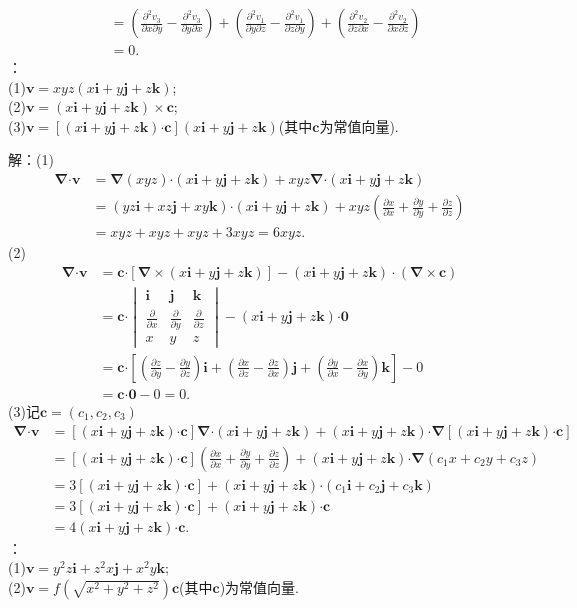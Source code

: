 \documentclass[12pt,UTF8,fleqn]{ctexart}
\newcommand{\pp}[2]{\frac{\partial #1}{\partial #2}}
\begin{document}
\begin{enumerate}
\[\begin{split}
&=(\frac{\partial^2 v_3}{\partial x\partial y}-\frac{\partial^2 v_3}{\partial y\partial x})+(\frac{\partial^2 v_1}{\partial y\partial  z}-\frac{\partial^2 v_1}{\partial z\partial y})+(\frac{\partial^2 v_2}{\partial z\partial x}-\frac{\partial^2 v_2}{\partial x\partial z})\\
&=0.
\end{split}\]
：\\
(1)$\bm v=xyz(x\bm i+y\bm j+z\bm k)$;\\
(2)$\bm v=(x\bm i+y\bm j+z\bm k)\times\bm c$;\\
(3)$\bm v=[(x\bm i+y\bm j+z\bm k)\bm\cdot\bm c](x\bm i+y\bm j+z\bm k)$(其中$\bm c$为常值向量).

解：(1)\[\begin{split}
\bm\nabla\bm\cdot\bm v&=\bm\nabla(xyz)\bm\cdot(x\bm i+y\bm j+z\bm k)+xyz\bm\nabla\bm\cdot(x\bm i+y\bm j+z\bm k)\\
&=(yz\bm i+xz\bm j+xy\bm k)\bm\cdot(x\bm i+y\bm j+z\bm k)+xyz(\pp xx+\pp yy+\pp zz)\\
&=xyz+xyz+xyz+3xyz=6xyz.
\end{split}\]
(2)\[\begin{split}
\bm\nabla\bm\cdot\bm v&=\bm c\bm\cdot[\bm\nabla\times(x\bm i+y\bm j+z\bm k)]-(x\bm i+y\bm j+z\bm k)\cdot(\bm\nabla\times\bm c)\\
&=\bm c\bm\cdot\begin{vmatrix}
\bm i&\bm j&\bm k\\
\pp{}x&\pp{}y&\pp{}z\\
x&y&z
\end{vmatrix}-(x\bm i+y\bm j+z\bm k)\bm\cdot\bm0\\
&=\bm c\bm\cdot[(\pp zy-\pp yz)\bm i+(\pp xz-\pp zx)\bm j+(\pp yx-\pp xy)\bm k]-0\\
&=\bm c\bm\cdot\bm0-0=0.
\end{split}\]
(3)记$\bm c=(c_1,c_2,c_3)$
\[\begin{split}
\bm\nabla\bm\cdot\bm v&=[(x\bm i+y\bm j+z\bm k)\bm\cdot\bm c]\bm\nabla\bm\cdot(x\bm i+y\bm j+z\bm k)+(x\bm i+y\bm j+z\bm k)\bm\cdot\bm\nabla[(x\bm i+y\bm j+z\bm k)\bm\cdot\bm c]\\
&=[(x\bm i+y\bm j+z\bm k)\bm\cdot\bm c](\pp xx+\pp yy+\pp zz)+(x\bm i+y\bm j+z\bm k)\bm\cdot\bm\nabla(c_1x+c_2y+c_3z)\\
&=3[(x\bm i+y\bm j+z\bm k)\bm\cdot\bm c]+(x\bm i+y\bm j+z\bm k)\bm\cdot(c_1\bm i+c_2\bm j+c_3\bm k)\\
&=3[(x\bm i+y\bm j+z\bm k)\bm\cdot\bm c]+(x\bm i+y\bm j+z\bm k)\bm\cdot\bm c\\
&=4(x\bm i+y\bm j+z\bm k)\bm\cdot\bm c.
\end{split}\]
：\\
(1)$\bm v=y^2z\bm i+z^2x\bm j+x^2y\bm k$;\\
(2)$\bm v=f(\sqrt{x^2+y^2+z^2})\bm c$(其中$\bm c$)为常值向量.


\end{enumerate}
\end{document}
